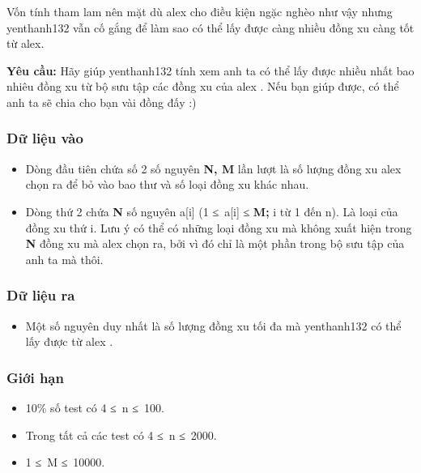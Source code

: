    Vốn tính tham lam nên mặt dù   alex   cho điều kiện ngặc nghèo như vậy nhưng   yenthanh132   vẫn cố gắng để làm sao có thể lấy được càng nhiều đồng xu càng tốt từ   alex.

\textbf{    Yêu cầu:   }   Hãy giúp   yenthanh132   tính xem anh ta có thể lấy được nhiều nhất bao nhiêu đồng xu từ bộ sưu tập các đồng xu của   alex   . Nếu bạn giúp được, có thể anh ta sẽ chia cho bạn vài đồng đấy :)  

\subsubsection{   Dữ liệu vào  }
\begin{itemize}
	\item     Dòng đầu tiên chứa số 2 số nguyên    \textbf{     N, M    }    lần lượt là số lượng đồng xu    alex    chọn ra để bỏ vào bao thư và số loại đồng xu khác nhau.   
	\item     Dòng thứ 2 chứa    \textbf{     N    }    số nguyên a[i] (1 ≤ a[i] ≤    \textbf{     M;    }    i từ 1 đến n). Là loại của đồng xu thứ i. Lưu ý có thể có những loại đồng xu mà không xuất hiện trong    \textbf{     N    }    đồng xu mà    alex    chọn ra, bởi vì đó chỉ là một phần trong bộ sưu tập của anh ta mà thôi.   
\end{itemize}

\subsubsection{   Dữ liệu ra  }
\begin{itemize}
	\item     Một số nguyên duy nhất là số lượng đồng xu tối đa mà    yenthanh132    có thể lấy được từ    alex    .   
\end{itemize}

\subsubsection{   Giới hạn  }
\begin{itemize}
	\item     10\% số test có 4 ≤ n ≤ 100.   
	\item     Trong tất cả các test có 4 ≤ n ≤ 2000.   
	\item     1 ≤ M ≤ 10000.   
\end{itemize}
\begin{itemize}
\end{itemize}

